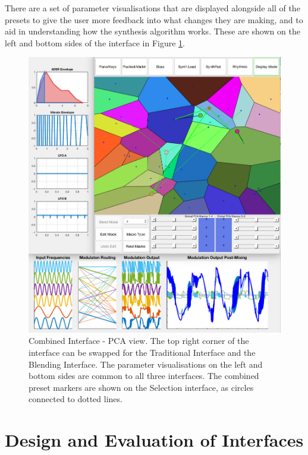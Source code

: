 \documentclass[11pt, oneside]{report}   	%
\begin{document}
 There are a set of parameter visualisations that are displayed alongside all of the presets to give the user more feedback into what changes they are making, and to aid in understanding how the synthesis algorithm works. These are shown on the left and bottom sides of the interface in Figure \ref{fig:CombinedInterface}.
\begin{figure}[h] 
	\centering
	\hspace*{-1.5cm}
	\includegraphics[width = 7.5in]{CombinedInterface1.png}
	\caption{Combined Interface - PCA view. The top right corner of the interface can be swapped for the Traditional Interface and the Blending Interface. The parameter visualisations on the left and bottom sides are common to all three interfaces. The combined preset markers are shown on the Selection interface, as circles connected to dotted lines.}
	\label{fig:CombinedInterface}
\end{figure}

\chapter{Design and Evaluation of Interfaces}
\end{document}
